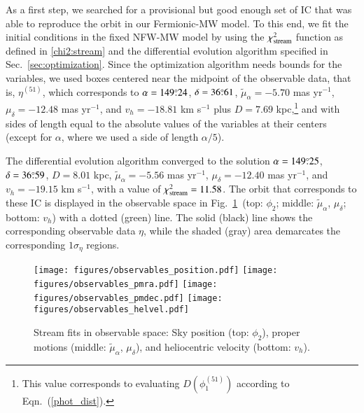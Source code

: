 \documentclass[twocolumn]{aa}
\begin{document}
As a first step, we searched for a provisional but good enough set of IC that was able to reproduce the orbit in our
Fermionic-MW model. To this end, we fit the initial conditions in the fixed NFW-MW model by using the $\chi^2_{\rm{stream}}$ function as defined in \cref{chi2:stream}
and the differential evolution algorithm specified in Sec.~\ref{sec:optimization}. Since the optimization algorithm
needs bounds for the variables, we used boxes centered near the midpoint
of the observable data, that is, $\eta^{(51)}$, which corresponds to $\alpha=149\overset{\circ}{.} 24$, $\delta=36\overset{\circ}{.} 61$, $\tilde{\mu}_\alpha=-5.70$ mas yr$^{-1}$, $\mu_\delta=-12.48$ mas yr$^{-1}$, and $v_h=-18.81$ km s$^{-1}$
plus $D=7.69$ kpc,\footnote{This value corresponds to evaluating $D(\phi_1^{(51)})$ according to Eqn.~(\ref{phot_dist}).} and with sides of length equal to the absolute values of the variables at their centers (except for $\alpha$, where we used a side of length $\alpha/5$).

The differential evolution algorithm converged to the solution
$\alpha=149\overset{\circ}{.} 25$, $\delta=36\overset{\circ}{.} 59$, $D=8.01$ kpc, $\tilde{\mu}_\alpha=-5.56$ mas yr$^{-1}$, $\mu_\delta=-12.40$ mas yr$^{-1}$, and $v_h=-19.15$ km s$^{-1}$, with a value of $\chi^2_{\rm{stream}}= 11.58$.
The orbit that corresponds to these IC is displayed in the observable space in Fig.~\ref{fig:obs_astrometry}~(top: $\phi_2$; middle: $\tilde{\mu}_\alpha$, $\mu_\delta$; bottom: $v_h$) with a dotted (green) line. The solid (black) line shows the corresponding observable data $\eta$, while the shaded (gray) area demarcates the corresponding $1\sigma_\eta$ regions.
\begin{figure}
   \centering
   \texttt{[image: figures/observables\_position.pdf]}
   \texttt{[image: figures/observables\_pmra.pdf]}
   \texttt{[image: figures/observables\_pmdec.pdf]}
   \texttt{[image: figures/observables\_helvel.pdf]}
   \caption{Stream fits in observable space: Sky position (top: $\phi_2$), proper motions (middle: $\tilde{\mu}_\alpha$, $\mu_\delta$), and heliocentric velocity (bottom: $v_h$).}
   \label{fig:obs_astrometry}
\end{figure}
\end{document}
